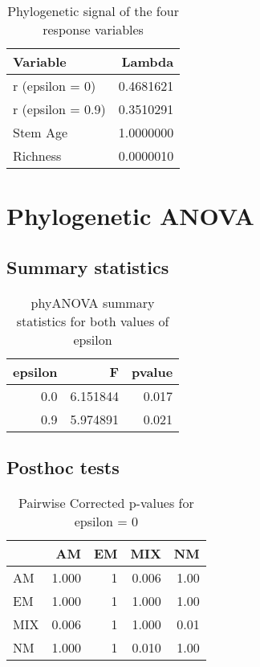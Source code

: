 \documentclass[]{article}
\begin{document}
\begin{table}[H]

\caption{\label{tab:unnamed-chunk-6}Phylogenetic signal of the four response variables}
\centering
\begin{tabular}{l|r}
\hline
Variable & Lambda\\
\hline
r (epsilon = 0) & 0.4681621\\
\hline
r (epsilon = 0.9) & 0.3510291\\
\hline
Stem Age & 1.0000000\\
\hline
Richness & 0.0000010\\
\hline
\end{tabular}
\end{table}

\hypertarget{phylogenetic-anova}{%
\section{Phylogenetic ANOVA}\label{phylogenetic-anova}}

\hypertarget{summary-statistics}{%
\subsection{Summary statistics}\label{summary-statistics}}

\begin{table}[H]

\caption{\label{tab:unnamed-chunk-7}phyANOVA summary statistics for both values of epsilon}
\centering
\begin{tabular}{r|r|r}
\hline
epsilon & F & pvalue\\
\hline
0.0 & 6.151844 & 0.017\\
\hline
0.9 & 5.974891 & 0.021\\
\hline
\end{tabular}
\end{table}

\hypertarget{posthoc-tests}{%
\subsection{Posthoc tests}\label{posthoc-tests}}

\begin{table}[H]

\caption{\label{tab:unnamed-chunk-8}Pairwise Corrected p-values for epsilon = 0}
\centering
\begin{tabular}{l|r|r|r|r}
\hline
  & AM & EM & MIX & NM\\
\hline
AM & 1.000 & 1 & 0.006 & 1.00\\
\hline
EM & 1.000 & 1 & 1.000 & 1.00\\
\hline
MIX & 0.006 & 1 & 1.000 & 0.01\\
\hline
NM & 1.000 & 1 & 0.010 & 1.00\\
\hline
\end{tabular}
\end{table}
\end{document}

